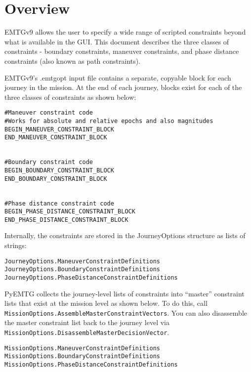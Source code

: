 \documentclass[11pt]{article}
\begin{document}
\newpage
\tableofcontents
\thispagestyle{empty}
\newpage

\clearpage
\setcounter{page}{1}



\section{Overview}
\label{sec:overview}

EMTGv9 allows the user to specify a wide range of scripted constraints beyond what is available in the GUI. This document describes the three classes of constraints - boundary constraints, maneuver constraints, and phase distance constraints (also known as path constraints).

EMTGv9's .emtgopt input file contains a separate, copyable block for each journey in the mission. At the end of each journey, blocks exist for each of the three classes of constraints as shown below:

\begin{verbatim}
#Maneuver constraint code
#Works for absolute and relative epochs and also magnitudes
BEGIN_MANEUVER_CONSTRAINT_BLOCK
END_MANEUVER_CONSTRAINT_BLOCK


#Boundary constraint code
BEGIN_BOUNDARY_CONSTRAINT_BLOCK
END_BOUNDARY_CONSTRAINT_BLOCK


#Phase distance constraint code
BEGIN_PHASE_DISTANCE_CONSTRAINT_BLOCK
END_PHASE_DISTANCE_CONSTRAINT_BLOCK
\end{verbatim}

Internally, the constraints are stored in the JourneyOptions structure as lists of strings:

\begin{verbatim}
JourneyOptions.ManeuverConstraintDefinitions
JourneyOptions.BoundaryConstraintDefinitions
JourneyOptions.PhaseDistanceConstraintDefinitions
\end{verbatim}

PyEMTG collects the journey-level lists of constraints into ``master'' constraint lists that exist at the mission level as shown below. To do this, call \texttt{MissionOptions.AssembleMasterConstraintVectors}. You can also disassemble the master constraint list back to the journey level via  \texttt{MissionOptions.DisassembleMasterDecisionVector}.

\begin{verbatim}
MissionOptions.ManeuverConstraintDefinitions
MissionOptions.BoundaryConstraintDefinitions
MissionOptions.PhaseDistanceConstraintDefinitions
\end{verbatim}
\end{document}
